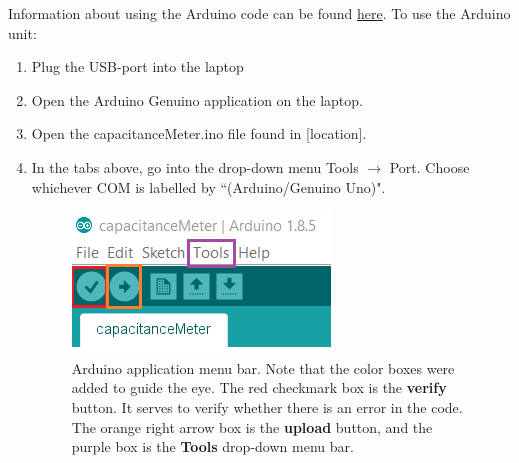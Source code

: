 \documentclass[12pt]{report}
\def\anhkhoi#1{{\color{purple}[#1]}}
\begin{document}
\noindent Information about using the Arduino code can be found \href{https://www.arduino.cc/en/Tutorial/CapacitanceMeter}{here}. To use the Arduino unit:
\begin{enumerate}
\item Plug the USB-port into the laptop
\item Open the Arduino Genuino application on the laptop.
\item Open the capacitanceMeter.ino file found in \anhkhoi{location}.

\item In the tabs above, go into the drop-down menu Tools $\rightarrow$ Port. Choose whichever COM is labelled by ``(Arduino/Genuino Uno)".
\begin{figure}[H]
\centering
\includegraphics[width=0.5 \textwidth]{lab1-Arduino-menu-bar.png}
\caption{Arduino application menu bar. Note that the color boxes were added to guide the eye. The red checkmark box is the \textbf{verify} button. It serves to verify whether there is an error in the code. The orange right arrow box is the \textbf{upload} button, and the purple box is the \textbf{Tools} drop-down menu bar.}
\label{Fig:ArduinoMenuBar}
\end{figure}


\end{enumerate}
\end{document}
